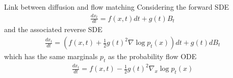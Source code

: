 \documentclass{beamer}
\begin{document}
\begin{frame}{Link between diffusion and flow matching}
    Considering the forward SDE 
    \begin{align*}
        \frac{dx_t}{dt}= f(x,t)dt + g(t)B_t
    \end{align*}
    and the associated reverse SDE
    \begin{align*}
        \frac{dx_t}{dt}= \left( f(x,t)+\frac{1}{2}g(t)^2\nabla\log p_t(x) \right)dt + g(t)dB_t
    \end{align*}
    which has the same marginals \(p_t\) as the probability flow ODE
    \begin{align*}
        \frac{dx_t}{dt}=f(x,t)-\frac{1}{2}g(t)^2\nabla_x\log p_t(x)
    \end{align*}
\end{frame}
\end{document}
